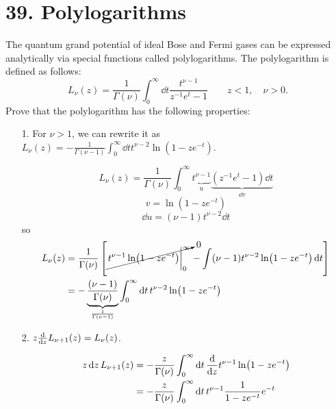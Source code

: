 \documentclass[a4paper,twoside]{article}
\begin{document}
\section*{39. Polylogarithms}
The quantum grand potential of ideal Bose and Fermi gases can be expressed analytically via special functions called polylogarithms. The polylogarithm is defined as follows:
\begin{equation}
    L_{\nu}(z) = \frac{1}{\Gamma(\nu)} \int_0^{\infty} \dd{t} \frac{t^{\nu - 1}}{z^{-1} e^{t} - 1} \qquad z < 1, \quad \nu > 0.
\end{equation}
Prove that the polylogarithm has the following properties:
\begin{itemize}
    \item[1.] For $ \nu > 1 $, we can rewrite it as $ L_{\nu}(z) = - \frac{1}{\Gamma(\nu - 1)} \int_0^{\infty} \dd{t} t^{\nu -2} \ln(1-ze^{-t}) $.
        \begin{problem}
            \begin{equation}
                L_{\nu}(z) = \frac{1}{\Gamma(\nu)} \int_0^{\infty}  \underbrace{t^{\nu - 1}}_{u} \underbrace{(z^{-1} e^{t} - 1) \dd{t}}_{\dd{v}}
            \end{equation}
            \begin{equation}
                v = \ln(1 - z e^{-t})
            \end{equation}
            \begin{equation}
                \dd{u} = (\nu - 1) t^{\nu - 2} \dd{t}
            \end{equation}
            so
            \begin{align}
                L_{\nu}(z) &= \frac{1}{\Gamma(\nu)} \left[ \cancelto{0}{\eval{t^{\nu - 1} \ln(1 - z e^{- t})}_{0}^{\infty}} - \int (\nu - 1)t^{\nu - 2} \ln(1 - z e^{- t}) \dd{t} \right] \\
                &= - \underbrace{\frac{(\nu - 1)}{\Gamma(\nu)}}_{\frac{1}{\Gamma(\nu - 1)}} \int_0^{\infty} \dd{t} t^{\nu - 2} \ln(1-z e^{-t})
            \end{align}
        \end{problem}
    \item[2.] $ z \dv{z} L_{\nu + 1}(z) = L_{\nu}(z) $.
        \begin{problem}
            \begin{align}
                z \dd{z} L_{\nu + 1}(z) &= - \frac{z}{\Gamma(\nu)} \int_{0}^{\infty} \dd{t} \dv{z} t^{\nu - 1} \ln(1 - z e^{-t}) \\
                &= - \frac{z}{\Gamma(\nu)} \int_0^{\infty} \dd{t} t^{\nu - 1} \frac{1}{1 - z e^{-t}} e^{-t} \\

\end{align}
\end{problem}
\end{itemize}
\end{document}
